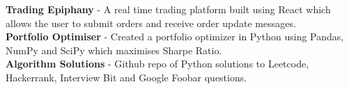 
\begin{cvparagraph}

\textbf{Trading Epiphany}
- A real time trading platform built using React which allows the user to submit orders and
receive order update messages.\\
\textbf{Portfolio Optimiser}
- Created a portfolio optimizer in Python using Pandas, NumPy and SciPy which maximises Sharpe Ratio.\\
\textbf{Algorithm Solutions}
- Github repo of Python solutions to Leetcode, Hackerrank, Interview Bit and Google Foobar questions.
\end{cvparagraph}
